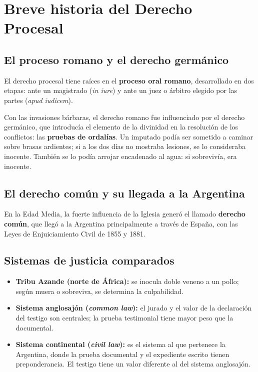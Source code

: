 \documentclass[12pt,oneside]{book}
\begin{document}
\section{Breve historia del Derecho Procesal}

\subsection{El proceso romano y el derecho germánico}

El derecho procesal tiene raíces en el \textbf{proceso oral romano}, desarrollado en dos etapas: ante un magistrado (\textit{in iure}) y ante un juez o árbitro elegido por las partes (\textit{apud iudicem}).

Con las invasiones bárbaras, el derecho romano fue influenciado por el derecho germánico, que introducía el elemento de la divinidad en la resolución de los conflictos: las \textbf{pruebas de ordalías}. Un imputado podía ser sometido a caminar sobre brasas ardientes; si a los dos días no mostraba lesiones, se lo consideraba inocente. También se lo podía arrojar encadenado al agua: si sobrevivía, era inocente.

\subsection{El derecho común y su llegada a la Argentina}

En la Edad Media, la fuerte influencia de la Iglesia generó el llamado \textbf{derecho común}, que llegó a la Argentina principalmente a través de España, con las Leyes de Enjuiciamiento Civil de 1855 y 1881.

\subsection{Sistemas de justicia comparados}

\begin{itemize}
\item \textbf{Tribu Azande (norte de África):} se inocula doble veneno a un pollo; según muera o sobreviva, se determina la culpabilidad.
\item \textbf{Sistema anglosajón (\textit{common law}):} el jurado y el valor de la declaración del testigo son centrales; la prueba testimonial tiene mayor peso que la documental.
\item \textbf{Sistema continental (\textit{civil law}):} es el sistema al que pertenece la Argentina, donde la prueba documental y el expediente escrito tienen preponderancia. El testigo tiene un valor diferente al del sistema anglosajón.
\end{itemize}
\end{document}
